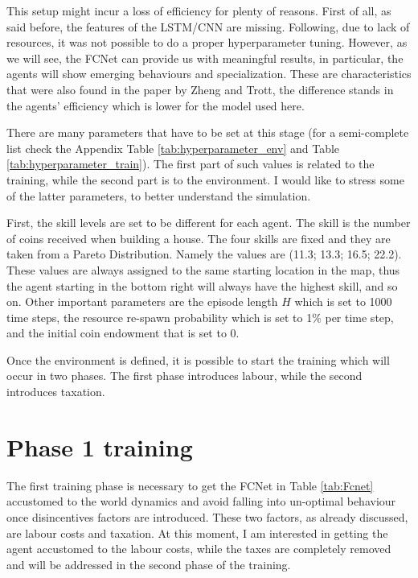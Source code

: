 This setup might incur a loss of efficiency for plenty of reasons. First of all, as said before, the features of the LSTM/CNN are missing. Following, due to lack of resources, it was not possible to do a proper hyperparameter tuning. However, as we will see, the FCNet can provide us with meaningful results, in particular, the agents will show emerging behaviours and specialization. These are characteristics that were also found in the paper by Zheng and Trott, the difference stands in the agents' efficiency which is lower for the model used here.

There are many parameters that have to be set at this stage (for a semi-complete list check the Appendix Table \ref{tab:hyperparameter_env} and Table \ref{tab:hyperparameter_train}). The first part of such values is related to the training, while the second part is to the environment. I would like to stress some of the latter parameters, to better understand the simulation.

First, the skill levels are set to be different for each agent. The skill is the number of coins received when building a house. The four skills are fixed and they are taken from a Pareto Distribution. Namely the values are (11.3; 13.3; 16.5; 22.2). These values are always assigned to the same starting location in the map, thus the agent starting in the bottom right will always have the highest skill, and so on. Other important parameters are the episode length \( H \) which is set to 1000 time steps, the resource re-spawn probability which is set to 1\% per time step, and the initial coin endowment that is set to 0.

Once the environment is defined, it is possible to start the training which will occur in two phases. The first phase introduces labour, while the second introduces taxation.

\section{Phase 1 training}

The first training phase is necessary to get the FCNet in Table \ref{tab:Fcnet} accustomed to the world dynamics and avoid falling into un-optimal behaviour once disincentives factors are introduced. These two factors, as already discussed, are labour costs and taxation. At this moment, I am interested in getting the agent accustomed to the labour costs, while the taxes are completely removed and will be addressed in the second phase of the training. 


